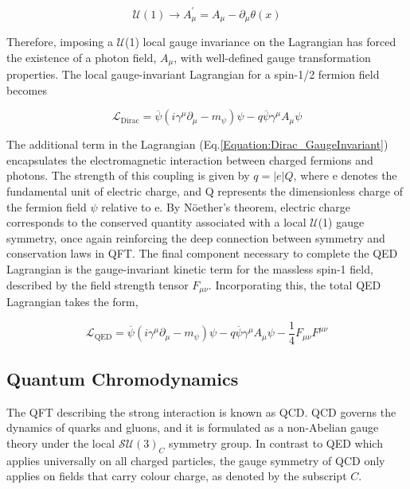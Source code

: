 \begin{equation}
    \mathcal{U}(1) \rightarrow A_\mu^{\prime} = A_\mu - \partial_\mu \theta(x) 
\end{equation}

Therefore, imposing a $\mathcal{U}$(1) local gauge invariance on the Lagrangian has forced the existence of a photon field, $A_\mu$, with well-defined gauge transformation properties. The local gauge-invariant Lagrangian for a spin-1/2 fermion field becomes

\begin{equation}
    \mathcal{L}_{\text{Dirac}} = \overline{\psi}(i\gamma^\mu \partial_\mu - m_{\psi}) \psi - q\overline{\psi}\gamma^\mu A_\mu\psi
\label{Equation:Dirac_GaugeInvariant}
\end{equation}

The additional term in the Lagrangian (Eq.\ref{Equation:Dirac_GaugeInvariant}) encapsulates the electromagnetic interaction between charged fermions and photons. The strength of this coupling is given by $q = |e|Q$, where e denotes the fundamental unit of electric charge, and Q represents the dimensionless charge of the fermion field $\psi$ relative to e. By N\"{o}ether's theorem, electric charge corresponds to the conserved quantity associated with a local $\mathcal{U}$(1) gauge symmetry, once again reinforcing the deep connection between symmetry and conservation laws in QFT. The final component necessary to complete the QED Lagrangian is the gauge-invariant kinetic term for the massless spin-1 field, described by the field strength tensor $F_{\mu\nu}$. Incorporating this, the total QED Lagrangian takes the form,

\begin{equation}
    \mathcal{L}_{\text{QED}} = \overline{\psi}(i\gamma^\mu \partial_\mu - m_{\psi}) \psi - q\overline{\psi}\gamma^\mu A_\mu\psi - \frac{1}{4}F_{\mu\nu}F^{\mu\nu}
\label{Equation:QED_GaugeInvariant}
\end{equation}

\subsection{Quantum Chromodynamics}

The QFT describing the strong interaction is known as \ac{QCD}. QCD governs the dynamics of quarks and gluons, and it is formulated as a non-Abelian gauge theory under the local $\mathcal{SU}(3)_C$ symmetry group. In contrast to QED which applies universally on all charged particles, the gauge symmetry of QCD only applies on fields that carry colour charge, as denoted by the subscript $C$.

